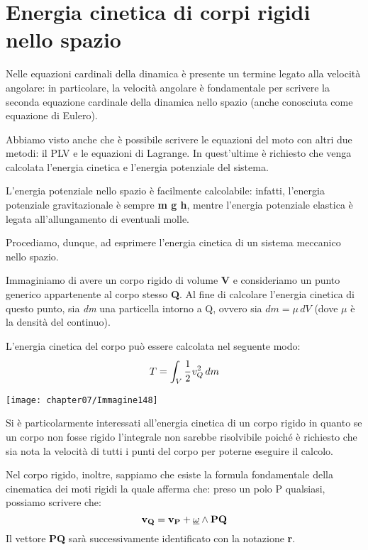 \section{Energia cinetica di corpi rigidi nello spazio}

Nelle equazioni cardinali della dinamica è presente un termine legato alla velocità angolare: in particolare, la velocità angolare è fondamentale per scrivere la seconda equazione cardinale della dinamica nello spazio (anche conosciuta come equazione di Eulero).

Abbiamo visto anche che è possibile scrivere le equazioni del moto con altri due metodi: il PLV e le equazioni di Lagrange. In quest'ultime è richiesto che venga calcolata l'energia cinetica e l'energia potenziale del sistema.

L'energia potenziale nello spazio è facilmente calcolabile: infatti, l'energia potenziale gravitazionale è sempre \textbf{m g h}, mentre l'energia potenziale elastica è legata all'allungamento di eventuali molle.

Procediamo, dunque, ad esprimere l'energia cinetica di un sistema meccanico nello spazio.\newline

\begin{minipage}{.65\textwidth}
Immaginiamo di avere un corpo rigido di volume \textbf{V} e consideriamo un punto generico appartenente al corpo stesso \textbf{Q}. Al fine di calcolare l'energia cinetica di questo punto, sia \emph{dm} una particella intorno a Q, ovvero sia $dm = \mu\,dV$ (dove $\mu$ è la densità del continuo).

L'energia cinetica del corpo può essere calcolata nel seguente modo:
\[T = \int_V \cfrac{1}{2}\,v_Q^2\,dm\]
\end{minipage}
\hfill
\begin{minipage}{.35\textwidth}
\centering
\texttt{[image: chapter07/Immagine148]}
\end{minipage}
\vspace{2mm}

Si è particolarmente interessati all'energia cinetica di un corpo rigido in quanto se un corpo non fosse rigido l'integrale non sarebbe risolvibile poiché è richiesto che sia nota la velocità di tutti i punti del corpo per poterne eseguire il calcolo.

Nel corpo rigido, inoltre, sappiamo che esiste la formula fondamentale della cinematica dei moti rigidi la quale afferma che: preso un polo P qualsiasi, possiamo scrivere che:
\[\mathbf{v_Q} = \mathbf{v_P} + \underline{\omega} \wedge \mathbf{PQ}\]
Il vettore \textbf{PQ} sarà successivamente identificato con la notazione \textbf{r}.

